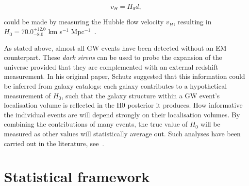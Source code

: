 \documentclass[%
 reprint,
 amsmath,amssymb,
 aps,
]{revtex4-2}
\begin{document}
\begin{equation}
	v_H = H_0 d,
\end{equation}

could be made by measuring the Hubble flow velocity $v_H$, resulting in $H_0 = 70.0^{+12.0}_{-8.0}$
km s$^{-1}$ Mpc$^{-1}$~\cite{LIGOScientific:2017adf}.

As stated above, almost all GW events have been detected without an EM counterpart. These
\textit{dark sirens} can be used to probe the expansion of the universe provided that they are
complemented with an external redshift measurement. In his original paper, Schutz suggested that
this information could be inferred from galaxy catalogs: each galaxy contributes to a hypothetical
measurement of $H_0$, such that the galaxy structure within a GW event's localisation volume is
reflected in the H0 posterior it produces. How informative the individual events are will depend
strongly on their localisation volumes. By combining the contributions of many events, the true
value of $H_0$ will be measured as other values will statistically average out. Such analyses have
been carried out in the literature,
see~\cite{DelPozzo:2011vcw,Chen:2017rfc,LIGOScientific:2018gmd,Gray:2019ksv,DES:2019ccw,DES:2020nay}.

\section{\label{sec:framework}Statistical framework}

\end{document}
